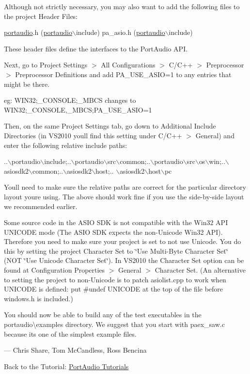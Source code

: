Although not strictly necessary, you may also want to add the following files to the project Header Files\+:


\begin{DoxyCode}
\hyperlink{namespaceportaudio}{portaudio}.h                     (\hyperlink{namespaceportaudio}{portaudio}\(\backslash\)include)
pa\_asio.h                       (\hyperlink{namespaceportaudio}{portaudio}\(\backslash\)include)
\end{DoxyCode}


These header files define the interfaces to the Port\+Audio A\+PI.

Next, go to Project Settings $>$ All Configurations $>$ C/\+C++ $>$ Preprocessor $>$ Preprocessor Definitions and add P\+A\+\_\+\+U\+S\+E\+\_\+\+A\+S\+IO=1 to any entries that might be there.

eg\+: W\+I\+N32;\+\_\+\+C\+O\+N\+S\+O\+LE;\+\_\+\+M\+B\+CS changes to W\+I\+N32;\+\_\+\+C\+O\+N\+S\+O\+LE,\+\_\+\+M\+B\+CS;P\+A\+\_\+\+U\+S\+E\+\_\+\+A\+S\+IO=1

Then, on the same Project Settings tab, go down to Additional Include Directories (in V\+S2010 you\textquotesingle{}ll find this setting under C/\+C++ $>$ General) and enter the following relative include paths\+:


\begin{DoxyCode}
..\(\backslash\)portaudio\(\backslash\)include;..\(\backslash\)portaudio\(\backslash\)src\(\backslash\)common;..\(\backslash\)portaudio\(\backslash\)src\(\backslash\)os\(\backslash\)win;..\(\backslash\)asiosdk2\(\backslash\)common;..\(\backslash\)asiosdk2\(\backslash\)host;..
      \(\backslash\)asiosdk2\(\backslash\)host\(\backslash\)pc
\end{DoxyCode}


You\textquotesingle{}ll need to make sure the relative paths are correct for the particular directory layout you\textquotesingle{}re using. The above should work fine if you use the side-\/by-\/side layout we recommended earlier.

Some source code in the A\+S\+IO S\+DK is not compatible with the Win32 A\+PI U\+N\+I\+C\+O\+DE mode (The A\+S\+IO S\+DK expects the non-\/\+Unicode Win32 A\+PI). Therefore you need to make sure your project is set to not use Unicode. You do this by setting the project Character Set to \char`\"{}\+Use Multi-\/\+Byte Character Set\char`\"{} (N\+OT \char`\"{}\+Use Unicode Character Set\char`\"{}). In V\+S2010 the Character Set option can be found at Configuration Properties $>$ General $>$ Character Set. (An alternative to setting the project to non-\/\+Unicode is to patch asiolist.\+cpp to work when U\+N\+I\+C\+O\+DE is defined\+: put \#undef U\+N\+I\+C\+O\+DE at the top of the file before windows.\+h is included.)

You should now be able to build any of the test executables in the portaudio\textbackslash{}examples directory. We suggest that you start with paex\+\_\+saw.\+c because it\textquotesingle{}s one of the simplest example files.

--- Chris Share, Tom Mc\+Candless, Ross Bencina

Back to the Tutorial\+: \hyperlink{tutorial_start}{Port\+Audio Tutorials} 